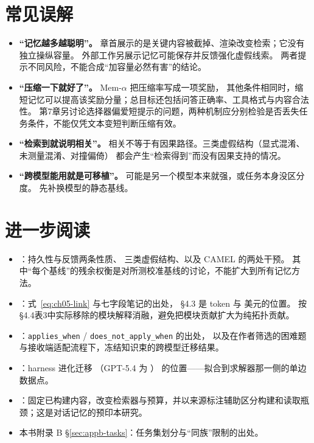 \section*{常见误解}
\begin{itemize}
  \item \textbf{``记忆越多越聪明''。}
        章首展示的是关键内容被截掉、渲染改变检索；它没有独立操纵容量。
        外部工作另展示记忆可能保存并反馈强化虚假线索\cite{trap-trajectory-2605}。
        两者提示不同风险，不能合成“加容量必然有害”的结论。
  \item \textbf{``压缩一下就好了''。}
        Mem-$\alpha$ 把压缩率写成一项奖励\cite{memalpha-2509}，
        其他条件相同时，缩短记忆可以提高该奖励分量；总目标还包括问答正确率、工具格式与内容合法性。
        第7章另讨论选择器偏爱短提示的问题，两种机制应分别检验是否丢失任务条件，不能仅凭文本变短判断压缩有效。
  \item \textbf{``检索到就说明相关''。}
        相关不等于有因果路径。三类虚假结构（显式混淆、未测量混淆、对撞偏倚）
        都会产生``检索得到''而没有因果支持的情况\cite{trap-trajectory-2605}。
  \item \textbf{``跨模型能用就是可移植''。}
        可能是另一个模型本来就强，或任务本身没区分度。
        先补换模型的静态基线。
\end{itemize}

\section*{进一步阅读}
\begin{itemize}
  \item \cite{trap-trajectory-2605}：持久性与反馈两条性质、
        三类虚假结构、以及 CAMEL 的两处干预。
        其中“每个基线”的残余权衡是对所测校准基线的讨论，不能扩大到所有记忆方法。
  \item \cite{amem-2502}：式~\eqref{eq:ch05-link} 与七字段笔记的出处，
        §4.3 是  token 与  美元的位置。
        按§4.4表3中实际移除的模块解释消融，避免把模块贡献扩大为纯拓扑贡献。
  \item \cite{ksi-2607}：\texttt{applies\_when} / \texttt{does\_not\_apply\_when} 的出处，
        以及在作者筛选的困难题与接收端适配流程下，冻结知识束的跨模型迁移结果。
  \item \cite{harness-eval-2607}：harness 进化迁移 （GPT-5.4 为 ）
        的位置——拟合到求解器那一侧的单边数据点。
  \item \cite{raw-history-memory-2610}：固定已构建内容，改变检索器与预算，并以来源标注辅助区分构建和读取瓶颈；这是对话记忆的预印本研究。
  \item 本书附录 B §\ref{sec:appb-tasks}：任务集划分与``同族''限制的出处。
\end{itemize}
